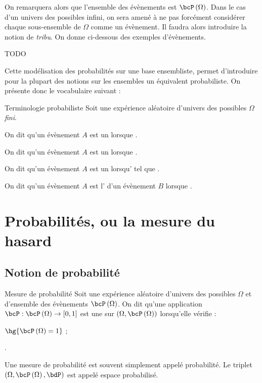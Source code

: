 \documentclass[a4paper,french,bookmarks]{article}
\begin{document}
On remarquera alors que l'ensemble des évènements est $\bcP\left(\Omega\right)$. Dans le cas d'un univers des possibles infini, on sera amené à ne pas forcément considérer chaque sous-ensemble de $\Omega$ comme un évènement. Il faudra alors introduire la notion de \textit{tribu}. On donne ci-dessous des exemples d'évènements.

\begin{example}{}{}
    TODO
\end{example}

Cette modélisation des probabilités sur une base ensembliste, permet d'introduire pour la plupart des notions sur les ensembles un équivalent probabiliste. On présente donc le vocabulaire suivant :

\begin{definition}{Terminologie probabiliste}{}
    Soit une expérience aléatoire d'univers des possibles $\Omega$ \textit{fini}. 
    
    \begin{enumerate}
        \ithand On dit qu'un évènement $A$ est un  lorsque .
        
        \ithand On dit qu'un évènement $A$ est un  lorsque .
        
        \ithand On dit qu'un évènement $A$ est un  lorsqu' tel que .
        
        \ithand On dit qu'un évènement $A$ est l' d'un évènement $B$ lorsque .
        
        \ithand
    \end{enumerate}
\end{definition}

\section{Probabilités, ou la mesure du hasard}

\subsection{Notion de probabilité}

\begin{definition}{Mesure de probabilité}{}
    Soit une expérience aléatoire d'univers des possibles $\Omega$ et d'ensemble des évènements $\bcP\left(\Omega\right)$. On dit qu'une application $\bcP : \bcP\left(\Omega\right) \to \left[0, 1\right]$ est une  sur $\left(\Omega, \bcP\left(\Omega\right)\right)$ lorsqu'elle vérifie :
    \begin{psse}
        \item $\hg{\bcP\left(\Omega\right) = 1}$ ;
        \item {}.
    \end{psse}
\end{definition}

Une mesure de probabilité est souvent simplement appelé probabilité. Le triplet $\left(\Omega, \bcP\left(\Omega\right), \bdP\right)$ est appelé espace probabilisé.
\end{document}
